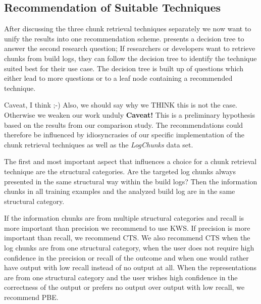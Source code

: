 \subsection{Recommendation of Suitable Techniques}
After discussing the three chunk retrieval techniques separately we
now want to unify the results into one recommendation scheme.
 presents a decision tree
to answer the second research question;
If researchers or developers want to retrieve chunks from build logs,
they can follow the decision tree to identify the technique
suited best for their use case.
The decision tree is built up of questions
which either lead to more questions or to a leaf node containing a
recommended technique.


Caveat, I think ;-) Also, we should say why we THINK this is not the case.
Otherwise we weaken our work unduly
\textbf{Caveat!}
This is a preliminary hypothesis based on the results
from our comparison study.
The recommendations could therefore be
influenced by idiosyncrasies of our specific implementation of the
chunk retrieval techniques as well as the \emph{LogChunks}
data set.

The first and most important aspect that influences a choice for
a chunk retrieval technique are the structural categories.
Are the targeted log chunks always presented in
the same structural way within the build logs? Then the information
chunks in all training examples and the analyzed build log are in the
same structural category.

If the information chunks are from multiple structural categories
and recall is more important than precision we recommend
to use KWS\@.
If precision is more important than recall, we
recommend CTS\@.
We also recommend CTS when the log chunks are
from one structural category, when the user does not require high
confidence in the precision or recall of the outcome and when one
would rather have output with low recall instead of no output at all.
When the representations are from one structural category and the user
wishes high confidence in the correctness of the output or prefers
no output over output with low recall, we recommend PBE\@.

